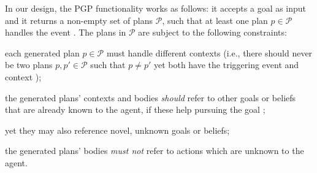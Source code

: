In our design,
the \ac{PGP} functionality works as follows:
it accepts a goal  as input
and
it returns a non-empty set of plans $\mathcal{P}$, %
such that at least one plan $p \in \mathcal{P}$ handles the event .
%
The plans in $\mathcal{P}$ are subject to the following constraints:
%
\begin{enumerate*}[label=\textbf{(C\arabic*)}]
    \item each generated plan $p \in \mathcal{P}$ must handle different contexts
    (i.e., there should never be two plans $p,p' \in \mathcal{P}$ such that
    $p\neq p'$ yet both have the triggering event  and context );

    \item\label{item:allowed-refs} the generated plans' contexts and bodies \emph{should} refer %
    to other goals or beliefs
    that are already known to the agent,
    if these help pursuing the goal ;

    \item\label{item:novel-refs} yet they may also reference novel, unknown goals or beliefs;

    \item\label{item:forbidden-refs} the generated plans' bodies \emph{must not} refer to actions %
    which are unknown to the agent.
\end{enumerate*}

